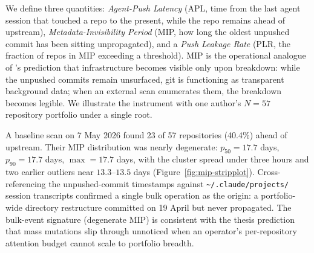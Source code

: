 \documentclass[12pt]{article}
\begin{document}
We define three quantities: \textit{Agent-Push Latency} (APL, time from the last agent session that touched a repo to the present, while the repo remains ahead of upstream), \textit{Metadata-Invisibility Period} (MIP, how long the oldest unpushed commit has been sitting unpropagated), and a \textit{Push Leakage Rate} (PLR, the fraction of repos in MIP exceeding a threshold). MIP is the operational analogue of \citet{star1996steps}'s prediction that infrastructure becomes visible only upon breakdown: while the unpushed commits remain unsurfaced, git is functioning as transparent background data; when an external scan enumerates them, the breakdown becomes legible. We illustrate the instrument with one author's $N=57$ repository portfolio under a single root.

A baseline scan on 7 May 2026 found 23 of 57 repositories (40.4\%) ahead of upstream. Their MIP distribution was nearly degenerate: $p_{50}=17.7$ days, $p_{90}=17.7$ days, $\max=17.7$ days, with the cluster spread under three hours and two earlier outliers near $13.3$--$13.5$ days (Figure~\ref{fig:mip-stripplot}). Cross-referencing the unpushed-commit timestamps against \texttt{\textasciitilde/.claude/projects/} session transcripts confirmed a single bulk operation as the origin: a portfolio-wide directory restructure committed on 19 April but never propagated. The bulk-event signature (degenerate MIP) is consistent with the thesis prediction that mass mutations slip through unnoticed when an operator's per-repository attention budget cannot scale to portfolio breadth.
\end{document}
